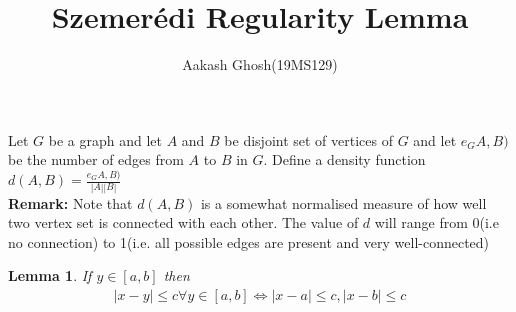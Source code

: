 \documentclass{article}
\title{Szemerédi Regularity Lemma}
\author{Aakash Ghosh(19MS129)}
\newtheorem{lemma}[theorem]{Lemma}
\begin{document}
\maketitle

\noindent
Let $G$ be a graph and let $A$ and $B$ be disjoint set of vertices of $G$ and let $e_GA,B)$ be the number of edges from $A$ to $B$ in $G$. Define a density function $d(A,B)=\frac{e_GA,B)}{|A||B|}$\\
\textbf{Remark: }Note that $d(A,B)$ is a somewhat normalised measure of how well two vertex set is connected  with each other. The value of $d$ will range from 0(i.e no connection) to 1(i.e. all possible edges are present and very well-connected)


\begin{lemma}
	If $y\in[a,b]$ then
	\begin{align}
	|x-y|\leq  c\forall y\in[a,b]\Leftrightarrow |x-a|\leq  c,|x-b|\leq  c
	\end{align}
\end{lemma}
\end{document}
